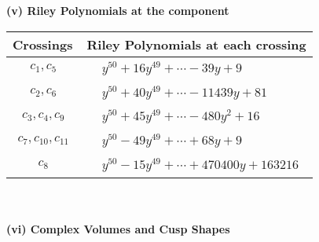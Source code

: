 \documentclass[1p]{elsarticle_modified}
\theoremstyle{definition}
\begin{document}
\newpage\renewcommand{\arraystretch}{1}
\flushleft \textbf{(v) Riley Polynomials at the component}\newline \\
\begin{tabular}{m{50pt}|m{274pt}}
Crossings & \hspace{64pt}Riley Polynomials at each crossing \\
\hline $$\begin{aligned}c_{1},c_{5}\end{aligned}$$&$\begin{aligned}
&y^{50}+16 y^{49}+\cdots-39 y+9
\end{aligned}$\\
\hline $$\begin{aligned}c_{2},c_{6}\end{aligned}$$&$\begin{aligned}
&y^{50}+40 y^{49}+\cdots-11439 y+81
\end{aligned}$\\
\hline $$\begin{aligned}c_{3},c_{4},c_{9}\end{aligned}$$&$\begin{aligned}
&y^{50}+45 y^{49}+\cdots-480 y^2+16
\end{aligned}$\\
\hline $$\begin{aligned}c_{7},c_{10},c_{11}\end{aligned}$$&$\begin{aligned}
&y^{50}-49 y^{49}+\cdots+68 y+9
\end{aligned}$\\
\hline $$\begin{aligned}c_{8}\end{aligned}$$&$\begin{aligned}
&y^{50}-15 y^{49}+\cdots+470400 y+163216
\end{aligned}$\\
\hline
\end{tabular}\\~\\
\newpage\flushleft \textbf{(vi) Complex Volumes and Cusp Shapes}
\end{document}
